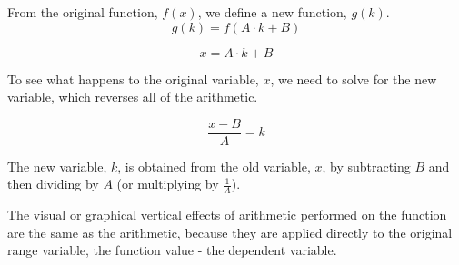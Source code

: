 \documentclass{ximera}
\begin{document}
From the original function, $f(x)$, we define a new function, $g(k)$.
\[
g(k) = f(A \cdot k + B)
\]


\[
x = A \cdot k + B
\]



To see what happens to the original variable, $x$, we need to solve for the new variable, which reverses all of the arithmetic. 


\[
\frac{x - B}{A} = k
\]



The new variable, $k$, is obtained from the old variable, $x$, by subtracting $B$ and then dividing by $A$ (or multiplying by $\frac{1}{A}$). 


The visual or graphical vertical effects of arithmetic performed on the function are the same as the arithmetic, because they are applied directly to the original range variable, the function value - the dependent variable.
\end{document}
